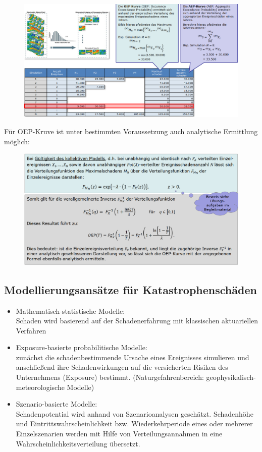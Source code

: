 \documentclass[12pt]{report}
\theoremstyle{dotless}
\theoremstyle{definition}
\begin{document}
\begin{figure}[ht]
	\centering
	\includegraphics[width= \textwidth]{Bilder/OEPAEP.png}
\end{figure}
 \vspace{4cm}
Für OEP-Kruve ist unter bestimmten Voraussetzung auch analytische Ermittlung möglich:
\begin{figure}[ht]
	\centering
	\includegraphics[width= \textwidth]{Bilder/Folie39.png}
\end{figure}

\subsection{Modellierungsansätze für Katastrophenschäden}

\begin{itemize}
\item Mathematisch-statistische Modelle: \\
Schaden wird basierend auf der Schadenerfahrung mit klassischen aktuariellen Verfahren
\item Exposure-basierte probabilitische Modelle: \\
zunächst die schadenbestimmende Ursache eines Ereignisses simulieren und anschließend ihre Schadenwirkungen auf die versicherten Risiken des Unternehmens (Exposure) bestimmt. (Naturgefahrenbereich: geophysikalisch-meteorologische Modelle)
\item Szenario-basierte Modelle: \\
Schadenpotential wird anhand von Szenarioanalysen geschätzt. Schadenhöhe und Eintrittswahrscheinlichkeit bzw. Wiederkehrperiode eines oder mehrerer Einzelszenarien werden mit Hilfe von Verteilungsannahmen in eine Wahrscheinlichkeitsverteilung übersetzt.
\end{itemize}
\end{document}
